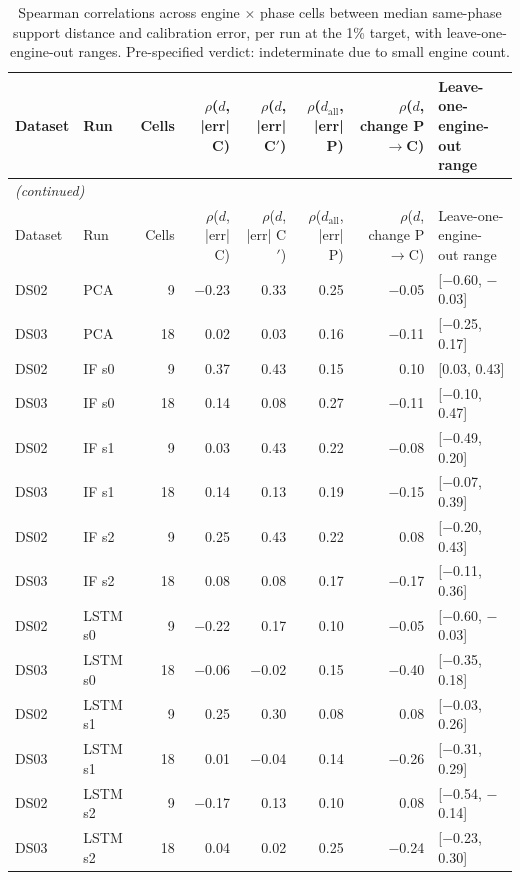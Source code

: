 \begin{scriptsize}
\begin{longtable}{llrrrrrl}
\caption{Spearman correlations across engine $\times$ phase cells between median same-phase support distance and calibration error, per run at the 1\% target, with leave-one-engine-out ranges. Pre-specified verdict: indeterminate due to small engine count.}\label{tab:s21_associations}\\
\toprule
Dataset & Run & Cells & \makecell{$\rho$($d$,\\|err| C)} & \makecell{$\rho$($d$,\\|err| C$'$)} & \makecell{$\rho$($d_{\mathrm{all}}$,\\|err| P)} & \makecell{$\rho$($d$, change\\P$\to$C)} & \makecell{Leave-one-engine-\\out range} \\
\midrule
\endfirsthead
\multicolumn{8}{l}{\emph{(continued)}}\\
\toprule
Dataset & Run & Cells & \makecell{$\rho$($d$,\\|err| C)} & \makecell{$\rho$($d$,\\|err| C$'$)} & \makecell{$\rho$($d_{\mathrm{all}}$,\\|err| P)} & \makecell{$\rho$($d$, change\\P$\to$C)} & \makecell{Leave-one-engine-\\out range} \\
\midrule
\endhead
\bottomrule
\endfoot
DS02 & PCA & 9 & $-$0.23 & 0.33 & 0.25 & $-$0.05 & [$-$0.60, $-$0.03] \\
\midrule
DS03 & PCA & 18 & 0.02 & 0.03 & 0.16 & $-$0.11 & [$-$0.25, 0.17] \\
\midrule
DS02 & IF s0 & 9 & 0.37 & 0.43 & 0.15 & 0.10 & [0.03, 0.43] \\
\midrule
DS03 & IF s0 & 18 & 0.14 & 0.08 & 0.27 & $-$0.11 & [$-$0.10, 0.47] \\
\midrule
DS02 & IF s1 & 9 & 0.03 & 0.43 & 0.22 & $-$0.08 & [$-$0.49, 0.20] \\
\midrule
DS03 & IF s1 & 18 & 0.14 & 0.13 & 0.19 & $-$0.15 & [$-$0.07, 0.39] \\
\midrule
DS02 & IF s2 & 9 & 0.25 & 0.43 & 0.22 & 0.08 & [$-$0.20, 0.43] \\
\midrule
DS03 & IF s2 & 18 & 0.08 & 0.08 & 0.17 & $-$0.17 & [$-$0.11, 0.36] \\
\midrule
DS02 & LSTM s0 & 9 & $-$0.22 & 0.17 & 0.10 & $-$0.05 & [$-$0.60, $-$0.03] \\
\midrule
DS03 & LSTM s0 & 18 & $-$0.06 & $-$0.02 & 0.15 & $-$0.40 & [$-$0.35, 0.18] \\
\midrule
DS02 & LSTM s1 & 9 & 0.25 & 0.30 & 0.08 & 0.08 & [$-$0.03, 0.26] \\
\midrule
DS03 & LSTM s1 & 18 & 0.01 & $-$0.04 & 0.14 & $-$0.26 & [$-$0.31, 0.29] \\
\midrule
DS02 & LSTM s2 & 9 & $-$0.17 & 0.13 & 0.10 & 0.08 & [$-$0.54, $-$0.14] \\
\midrule
DS03 & LSTM s2 & 18 & 0.04 & 0.02 & 0.25 & $-$0.24 & [$-$0.23, 0.30] \\
\end{longtable}
\end{scriptsize}
